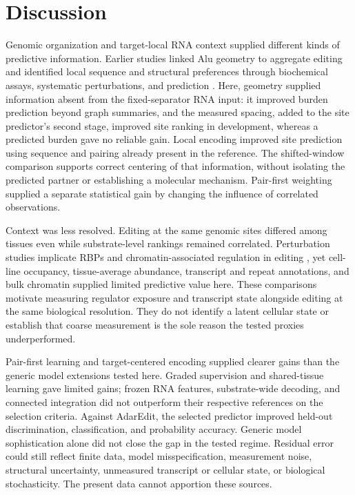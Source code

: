 \documentclass[9pt,twocolumn,twoside]{pnas-new}
\begin{document}
\section*{Discussion}

Genomic organization and target-local RNA context supplied different kinds of predictive information. Earlier studies linked Alu geometry to aggregate editing and identified local sequence and structural preferences through biochemical assays, systematic perturbations, and prediction \cite{Bazak2014Editability,Eggington2011,Wong2001,Lehmann2000,Uzonyi2021,ZambranoMila2023}. Here, geometry supplied information absent from the fixed-separator RNA input: it improved burden prediction beyond graph summaries, and the measured spacing, added to the site predictor's second stage, improved site ranking in development, whereas a predicted burden gave no reliable gain. Local encoding improved site prediction using sequence and pairing already present in the reference. The shifted-window comparison supports correct centering of that information, without isolating the predicted partner or establishing a molecular mechanism. Pair-first weighting supplied a separate statistical gain by changing the influence of correlated observations.

Context was less resolved. Editing at the same genomic sites differed among tissues even while substrate-level rankings remained correlated. Perturbation studies implicate RBPs and chromatin-associated regulation in editing \cite{Freund2020,QuinonesValdez2019,Cai2026,Park2026,Yi2026}, yet cell-line occupancy, tissue-average abundance, transcript and repeat annotations, and bulk chromatin supplied limited predictive value here. These comparisons motivate measuring regulator exposure and transcript state alongside editing at the same biological resolution. They do not identify a latent cellular state or establish that coarse measurement is the sole reason the tested proxies underperformed.

Pair-first learning and target-centered encoding supplied clearer gains than the generic model extensions tested here. Graded supervision and shared-tissue learning gave limited gains; frozen RNA features, substrate-wide decoding, and connected integration did not outperform their respective references on the selection criteria. Against AdarEdit, the selected predictor improved held-out discrimination, classification, and probability accuracy. Generic model sophistication alone did not close the gap in the tested regime. Residual error could still reflect finite data, model misspecification, measurement noise, structural uncertainty, unmeasured transcript or cellular state, or biological stochasticity. The present data cannot apportion these sources.
\end{document}
